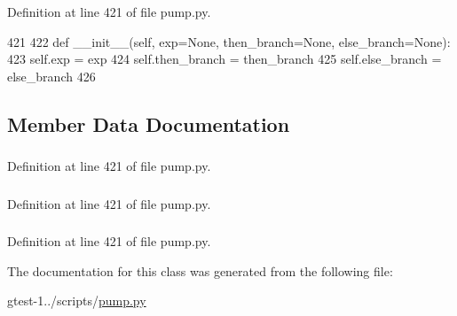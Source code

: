 \-Definition at line 421 of file pump.\-py.


\begin{DoxyCode}
421 
422   def __init__(self, exp=None, then_branch=None, else_branch=None):
423     self.exp = exp
424     self.then_branch = then_branch
425     self.else_branch = else_branch
426 

\end{DoxyCode}


\subsection{\-Member \-Data \-Documentation}
\hypertarget{classpump_1_1IfNode_a0a80780690b731c57dfe91bab6338474}{
\subsubsection[{else\-\_\-branch}]{}}\label{d5/d9d/classpump_1_1IfNode_a0a80780690b731c57dfe91bab6338474}


\-Definition at line 421 of file pump.\-py.

\hypertarget{classpump_1_1IfNode_a966ec49392882354106741a6a582fec4}{
\subsubsection[{exp}]{}}\label{d5/d9d/classpump_1_1IfNode_a966ec49392882354106741a6a582fec4}


\-Definition at line 421 of file pump.\-py.

\hypertarget{classpump_1_1IfNode_a619fd17feb1e6cf727f79a4c7b6ee936}{
\subsubsection[{then\-\_\-branch}]{}}\label{d5/d9d/classpump_1_1IfNode_a619fd17feb1e6cf727f79a4c7b6ee936}


\-Definition at line 421 of file pump.\-py.



\-The documentation for this class was generated from the following file\-:\begin{DoxyCompactItemize}
\item 
gtest-\/1../scripts/\hyperlink{pump_8py}{pump.\-py}\end{DoxyCompactItemize}
